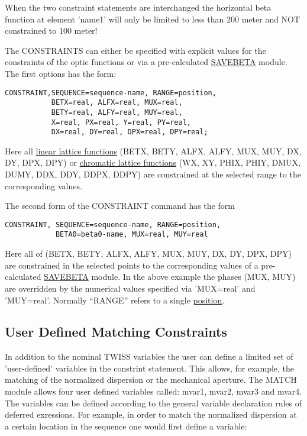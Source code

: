 When the two constraint statements are interchanged the horizontal beta
function at element 'name1' will only be limited to less than 200 meter
and NOT constrained to 100 meter! 

The CONSTRAINTS can either be specified with explicit values for the
constraints of the optic functions or via a pre-calculated
\href{../control/general.html#savebeta}{SAVEBETA} module. The first
options has the form: 
\begin{verbatim}
CONSTRAINT,SEQUENCE=sequence-name, RANGE=position,
           BETX=real, ALFX=real, MUX=real,                                            
           BETY=real, ALFY=real, MUY=real,
           X=real, PX=real, Y=real, PY=real,
           DX=real, DY=real, DPX=real, DPY=real;

\end{verbatim}

Here all \href{../Introduction/tables.html#linear}{linear lattice functions} 
(BETX, BETY, ALFX, ALFY, MUX, MUY, DX, DY, DPX, DPY)
or \href{../Introduction/tables.html#chrom}{chromatic lattice functions}
(WX, XY, PHIX, PHIY, DMUX, DUMY, DDX, DDY, DDPX, DDPY)
are constrained at the selected range to the corresponding values.

The second form of the CONSTRAINT command has the form
\begin{verbatim}
CONSTRAINT, SEQUENCE=sequence-name, RANGE=position,
            BETA0=beta0-name, MUX=real, MUY=real
\end{verbatim}

Here all of (BETX, BETY, ALFX, ALFY, MUX, MUY, DX, DY, DPX, DPY)
are constrained in the selected points to the corresponding values
of a pre-calculated \href{../control/general.html#savebeta}{SAVEBETA} module.
In the above example
the phases (MUX, MUY) are overridden by the numerical values specified via
'MUX=real' and 'MUY=real'.
Normally ``RANGE'' refers to a single
\href{../Introduction/ranges.html#position}{position}.

\subsection{User Defined Matching Constraints}

In addition to the nominal TWISS variables the user can define a limited
set of 'user-defined' variables in the constrint statement. This allows,
for example, the matching of the normalized dispersion or the mechanical
aperture. The MATCH module allows four user defined variables called:
mvar1, mvar2, mvar3 and mvar4. The variables can be defined according to
the general variable declaration rules of deferred exressions. For
example, in order to match the normalized dispersion at a certain
location in the sequence one would first define a variable:  

